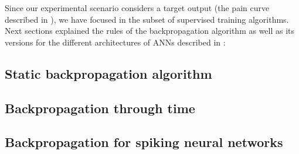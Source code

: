 
\label{sec:generalbackprop}


Since our experimental scenario considers a target output (the pain curve described in ), we have focused in the subset of supervised training algorithms. 
Next sections explained the rules of the backpropagation algorithm as well as its versions for the different architectures of ANNs described in :

\subsection{Static backpropagation algorithm}
\label{subsec:staticbackprop}

\subsection{Backpropagation through time}
\label{subsec:bptt}

\subsection{Backpropagation for spiking neural networks}
\label{subsec:snnbackprop}
